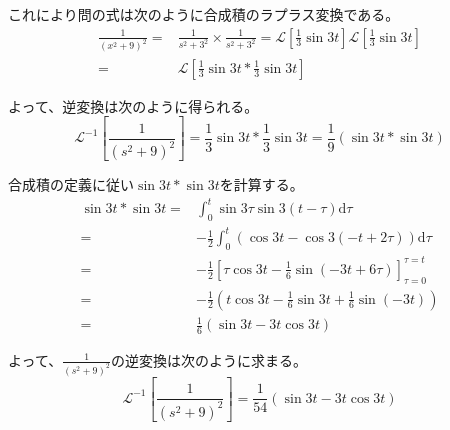 \documentclass[12pt,b5paper]{ltjsarticle}
\begin{document}
これにより問の式は次のように合成積のラプラス変換である。
\begin{align}
 \frac{1}{(x^2+9)^2}
  =&
 \frac{1}{s^2+3^2} \times \frac{1}{s^2+3^2}
 =
 \mathcal{L}\left[ \frac{1}{3}\sin 3t \right]\mathcal{L}\left[ \frac{1}{3}\sin 3t \right]\\
 =&
 \mathcal{L}\left[ \frac{1}{3}\sin 3t * \frac{1}{3}\sin 3t \right]
\end{align}

よって、逆変換は次のように得られる。
\begin{equation}
 \mathcal{L}^{-1}\left[ \frac{1}{(s^2+9)^2} \right]
  = \frac{1}{3}\sin 3t * \frac{1}{3}\sin 3t
  = \frac{1}{9}(\sin 3t * \sin 3t)
\end{equation}

合成積の定義に従い$\sin 3t * \sin 3t$を計算する。
\begin{align}
 \sin 3t * \sin 3t
 =& \int_{0}^{t}\sin3\tau \sin3(t-\tau)\mathrm{d}\tau\\
 =& -\frac{1}{2}\int_{0}^{t}\left(\cos 3t - \cos 3(-t+2\tau)\right)\mathrm{d}\tau\\
 =& -\frac{1}{2}\left[ \tau\cos 3t - \frac{1}{6}\sin (-3t+6\tau) \right]_{\tau=0}^{\tau=t}\\
 =& -\frac{1}{2}\left( t\cos 3t - \frac{1}{6}\sin 3t + \frac{1}{6}\sin (-3t) \right)\\
 =& \frac{1}{6}\left( \sin 3t - 3t\cos 3t \right)
\end{align}

よって、$\frac{1}{(s^2+9)^2}$の逆変換は次のように求まる。
\begin{equation}
 \mathcal{L}^{-1}\left[ \frac{1}{(s^2+9)^2} \right]
  = \frac{1}{54
}\left( \sin 3t - 3t\cos 3t \right)
\end{equation}


\hrulefill
\end{document}
